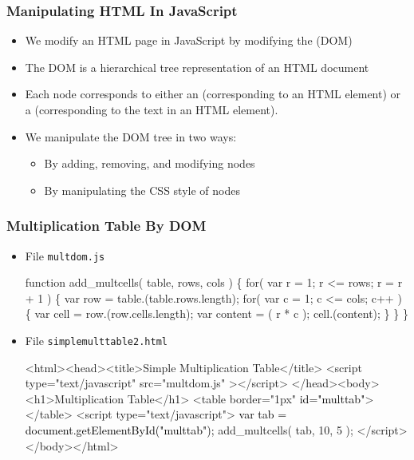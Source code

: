 \documentclass[dvipsnames]{beamer}
\begin{document}
\begin{frame}[fragile] 
\frametitle{Manipulating HTML In JavaScript}

\begin{itemize}
\item We modify an HTML page in JavaScript by modifying the
   (DOM)
\item The DOM is a hierarchical tree representation of an HTML document
\item Each node corresponds to either an 
  (corresponding to an HTML element) or a 
  (corresponding to the text in an HTML element).
\item We manipulate the DOM tree in two ways:
  \begin{itemize}
  \item By adding, removing, and modifying nodes
  \item By manipulating the CSS style of nodes
  \end{itemize}
\end{itemize}
\end{frame}

\begin{frame}[fragile] 
\frametitle{Multiplication Table By DOM}
  
\begin{itemize}
\item File \texttt{multdom.js}
  \begin{footnotesize}
\begin{semiverbatim}
function add_multcells( table, rows, cols ) \{
  for( var r = 1; r <= rows; r = r + 1 ) \{
    var row = table.(table.rows.length);
    for( var c = 1; c <= cols; c++ ) \{
      var cell = row.(row.cells.length);
      var content = ( r * c );
      cell.(content);
    \}
  \}
\}      
\end{semiverbatim}
  \end{footnotesize}
\item File \texttt{simplemulttable2.html}
\begin{footnotesize}
\begin{semiverbatim}
\color{gray}<html><head><title>Simple Multiplication Table</title>
<script type="text/javascript" src="multdom.js" ></script>
</head><body><h1>Multiplication Table</h1>
  <table border="1px" \textcolor{black}{id="multtab"}></table> 
  <script type="text/javascript">
    \textcolor{black}{var tab = document.getElementById("multtab");}
    add_multcells( tab, 10, 5 );
  </script></body></html>      
\end{semiverbatim}
  \end{footnotesize}
\end{itemize}
\end{frame}
\end{document}
